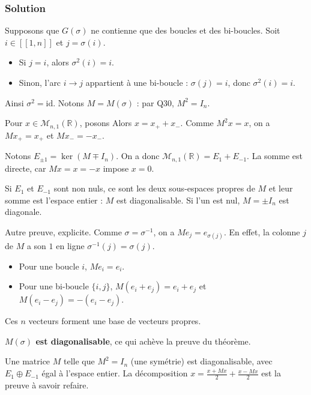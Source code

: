 \documentclass[11pt,a4paper]{article}
\providecommand{\tightlist}{\setlength{\itemsep}{0pt}\setlength{\parskip}{0pt}}
\newcommand{\equationajustee}[1]{%
  \sbox{\boiteequation}{$\displaystyle #1$}%
  \ifdim\wd\boiteequation>\linewidth
    \[\resizebox{\linewidth}{!}{\usebox{\boiteequation}}\]%
  \else
    \[#1\]%
  \fi}
\begin{document}
\hypertarget{solution-34}{%
\subsubsection{Solution}\label{solution-34}}

Supposons que \(G(\sigma)\) ne contienne que des boucles et des bi-boucles. Soit \(i\in[\![1,n]\!]\) et \(j=\sigma(i)\).

\begin{itemize}
\tightlist
\item
  Si \(j=i\), alors \(\sigma^2(i)=i\).
\item
  Sinon, l'arc \(i\to j\) appartient à une bi-boucle : \(\sigma(j)=i\), donc \(\sigma^2(i)=i\).
\end{itemize}

Ainsi \(\sigma^2=\mathrm{id}\). Notons \(M=M(\sigma)\) : par Q30, \(M^2=I_n\).

Pour \(x\in\mathcal M_{n,1}(\mathbb R)\), posons
\equationajustee{\begin{aligned}
x_+&=\frac{x+Mx}2,\\
x_-&=\frac{x-Mx}2.
\end{aligned}}
Alors \(x=x_++x_-\). Comme \(M^2x=x\), on a \(Mx_+=x_+\) et \(Mx_-=-x_-\).

Notons \(E_{\pm1}=\ker(M\mp I_n)\). On a donc \(\mathcal M_{n,1}(\mathbb R)=E_1+E_{-1}\). La somme est directe, car \(Mx=x=-x\) impose \(x=0\).

Si \(E_1\) et \(E_{-1}\) sont non nuls, ce sont les deux sous-espaces propres de \(M\) et leur somme est l'espace entier : \(M\) est diagonalisable. Si l'un est nul, \(M=\pm I_n\) est diagonale.

Autre preuve, explicite. Comme \(\sigma=\sigma^{-1}\), on a \(Me_j=e_{\sigma(j)}\). En effet, la colonne \(j\) de \(M\) a son \(1\) en ligne \(\sigma^{-1}(j)=\sigma(j)\).

\begin{itemize}
\tightlist
\item
  Pour une boucle \(i\), \(Me_i=e_i\).
\item
  Pour une bi-boucle \(\{i,j\}\), \(M(e_i+e_j)=e_i+e_j\) et \(M(e_i-e_j)=-(e_i-e_j)\).
\end{itemize}

Ces \(n\) vecteurs forment une base de vecteurs propres.

\textbf{\(M(\sigma)\) est diagonalisable}, ce qui achève la preuve du théorème.

\begin{methode}

Une matrice \(M\) telle que \(M^2=I_n\) (une symétrie) est diagonalisable, avec \(E_1\oplus E_{-1}\) égal à l'espace entier. La décomposition \(x=\frac{x+Mx}2+\frac{x-Mx}2\) est la preuve à savoir refaire.

\end{methode}
\end{document}
